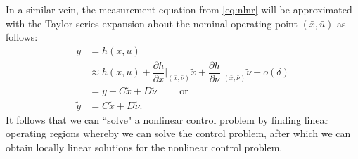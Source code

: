 In a similar vein, the measurement equation from \eqref{eq:nlnr} will be approximated with the Taylor series expansion about the nominal operating point $(\bar{x}, \bar{u})$ as follows:
%
\begin{align}
	y &= h(x, u) \nonumber \\
	  & \approx h(\bar{x}, \bar{u}) + \dfrac{\partial h}{\partial x}\bigg\rvert_{(\bar{x}, \bar{\nu})} \tilde{x} +  \dfrac{\partial h}{\partial \nu}\bigg\rvert_{(\bar{x}, \bar{\nu})} \tilde{\nu} + o(\delta)  \\
	  &= \bar{y} + C \tilde{x} + D \tilde{\nu} \qquad  \text{ or } \nonumber \\
	  \tilde{y} &= C  \tilde{x} + D \tilde{\nu}.
\end{align}
%
It follows that we can ``solve" a nonlinear control problem by finding linear operating regions whereby we can solve the control problem, after which we can obtain locally linear solutions for the nonlinear control problem.

